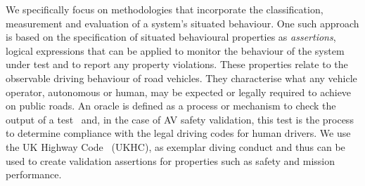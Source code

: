 We specifically focus on methodologies that incorporate the classification, measurement and evaluation of a system's situated behaviour. One such approach is based on the specification of situated behavioural properties as \emph{assertions}, logical expressions that can be applied 
to monitor the behaviour of the system under test and to report any property violations. 
%
These properties relate to the observable driving behaviour of road vehicles. They characterise what any vehicle operator, autonomous or human, %
%
%
may be expected or legally required to achieve on public roads. 
%
An oracle is defined as a process or mechanism to check the output of a test~\cite{howden1978theoretical}
and, in the case of AV safety validation, this test is the process to determine compliance with the 
legal driving codes for human drivers.
%
%
We use the UK Highway Code~\cite{highwayCode} (UKHC), as exemplar diving conduct and thus can be used to create validation assertions for properties such as safety and mission performance. %


